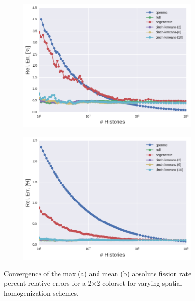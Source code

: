 \clearpage

\begin{figure}[h!]
\centering
\begin{subfigure}{\textwidth}
  \centering
  \includegraphics[width=0.9\linewidth]{figures/results/2x2/ensemble-transform/evo-fission-max}
  \caption{}
  \label{fig:chap11-2x2-fission-converge-max}
\end{subfigure}
\begin{subfigure}{\textwidth}
  \centering
  \includegraphics[width=0.9\linewidth]{figures/results/2x2/ensemble-transform/evo-fission-mean}
  \caption{}
  \label{fig:chap11-2x2-fission-converge-mean}
\end{subfigure}
\vspace{2mm}
\caption[Fission rate covergence for a 2$\times$2 colorset]{Convergence of the max (a) and mean (b) absolute fission rate percent relative errors for a 2$\times$2 colorset for varying spatial homogenization schemes.}
\label{fig:chap11-2x2-fission-converge}
\end{figure}

